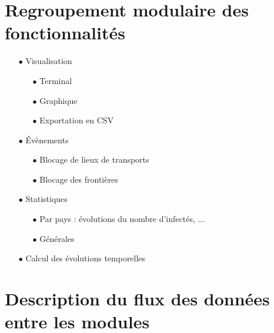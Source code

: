 \documentclass[12pt,a4paper]{report}
\begin{document}
\section*{Regroupement modulaire des fonctionnalités}
\begin{flushleft}
	\begin{itemize}
		\item[$\bullet$] Visualisation
			\begin{itemize}
				\item[$\bullet$] Terminal
				\item[$\bullet$] Graphique
				\item[$\bullet$] Exportation en CSV
			\end{itemize}
		\item[$\bullet$] Évènements
			\begin{itemize}
				\item[$\bullet$] Blocage de lieux de transports
				\item[$\bullet$] Blocage des frontières
			\end{itemize}
		\item[$\bullet$] Statistiques
			\begin{itemize}
				\item[$\bullet$] Par pays : évolutions du nombre d'infectés, ...
				\item[$\bullet$] Générales
			\end{itemize}
		\item[$\bullet$] Calcul des évolutions temporelles
	\end{itemize}
\end{flushleft}

\section*{Description du flux des données entre les modules}
\end{document}

